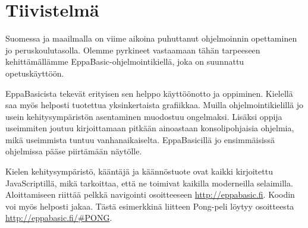 
\section*{Tiivistelmä}
Suomessa ja maailmalla on viime aikoina puhuttanut
ohjelmoinnin opettaminen jo peruskoulutasolla.
Olemme pyrkineet vastaamaan tähän tarpeeseen
kehittämällämme EppaBasic-ohjelmointikiellä, joka
on suunnattu opetuskäyttöön.

EppaBasicista tekevät erityisen sen helppo käyttöönotto
ja oppiminen. Kielellä saa myös helposti tuotettua
yksinkertaista grafiikkaa. Muilla ohjelmointikielillä
jo usein kehitysympäristön asentaminen muodostuu ongelmaksi.
Lisäksi oppija useimmiten joutuu kirjoittamaan pitkään
ainoastaan konsolipohjaisia ohjelmia, mikä useimmista
tuntuu vanhanaikaiselta. EppaBasicillä jo ensimmäisissä
ohjelmissa pääse piirtämään näytölle.

Kielen kehitysympäristö, kääntäjä ja käännöstuote ovat
kaikki kirjoitettu JavaScriptillä, mikä tarkoittaa, että
ne toimivat kaikilla moderneilla selaimilla. Aloittamiseen
riittää pelkkä navigointi osoitteeseen \url{http://eppabasic.fi}.
Koodin voi myös helposti jakaa. Tästä esimerkkinä liitteen
Pong-peli löytyy osoitteesta \url{http://eppabasic.fi/#PONG}.